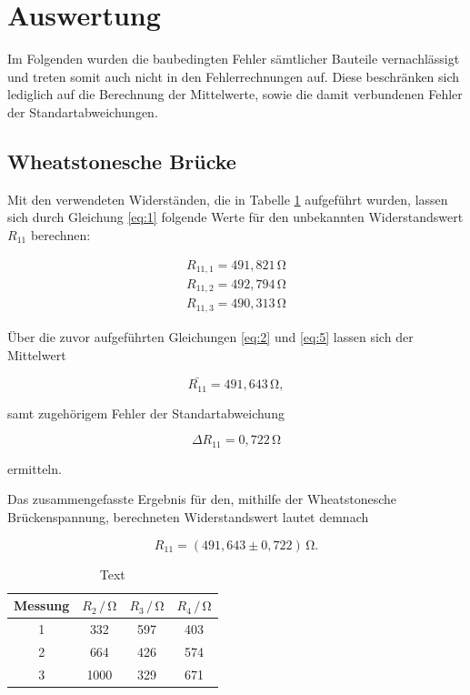 \section{Auswertung}
\label{sec:Auswertung}

Im Folgenden wurden die baubedingten Fehler sämtlicher Bauteile vernachlässigt und 
treten somit auch nicht in den Fehlerrechnungen auf. Diese beschränken sich lediglich auf 
die Berechnung der Mittelwerte, sowie die damit verbundenen Fehler der Standartabweichungen.


\subsection{Wheatstonesche Brücke}

Mit den verwendeten Widerständen, die in Tabelle \ref{tab:1} aufgeführt wurden, 
lassen sich durch Gleichung \ref{eq:1} folgende Werte für den 
unbekannten Widerstandswert $R_{11}$ berechnen:

\begin{align}
R_{11,1} = 491,821\,\si{\ohm} \nonumber \\
R_{11,2} = 492,794\,\si{\ohm} \nonumber \\
R_{11,3} = 490,313\,\si{\ohm} \nonumber 
\end{align}

\noindent
Über die zuvor aufgeführten Gleichungen \ref{eq:2} und \ref{eq:5} lassen sich der  
Mittelwert 

\begin{equation}
\bar{R_{11}} = 491,643\,\si{\ohm}, \nonumber
\end{equation}

\noindent
samt zugehörigem Fehler der Standartabweichung

\begin{equation}
\Delta R_{11} = 0,722\, \si{\ohm} \nonumber
\end{equation}

\noindent 
ermitteln.

\noindent
Das zusammengefasste Ergebnis für den, mithilfe der Wheatstonesche Brückenspannung, berechneten Widerstandswert
lautet demnach

\begin{equation}
R_{11} = (491,643 \pm 0,722)\,  \si{\ohm}. \nonumber
\end{equation}
    
\begin{table}
\normalsize

\centering
{}
\begin{tabular}{c c c c}
\toprule
        Messung & $R_{2} \,/\,\si{\ohm}$ & $R_{3} \,/\,\si{\ohm}$ & $R_{4} \,/\,\si{\ohm}$ \\
        \midrule
        1 & 332 & 597 & 403  \\
        2 & 664 & 426 & 574  \\
        3 & 1000 & 329 & 671 \\ 
        
\bottomrule

\end{tabular}

\caption{Text}
\label{tab:1}
\end{table}

